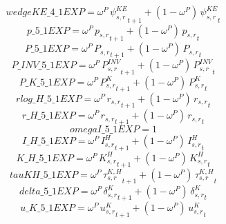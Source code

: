 \begin{dmath*}
wedgeKE\_4\_1EXP = {{\omega^{P}}}\, {{\psi^{KE}_{s,r}}}_{t+1}+\left(1-{{\omega^{P}}}\right)\, {{\psi^{KE}_{s,r}}}_{t}
\end{dmath*}
\begin{dmath*}
p\_5\_1EXP = {{\omega^{P}}}\, {{p_{s,r}}}_{t+1}+\left(1-{{\omega^{P}}}\right)\, {{p_{s,r}}}_{t}
\end{dmath*}
\begin{dmath*}
P\_5\_1EXP = {{\omega^{P}}}\, {{P_{s,r}}}_{t+1}+\left(1-{{\omega^{P}}}\right)\, {{P_{s,r}}}_{t}
\end{dmath*}
\begin{dmath*}
P\_INV\_5\_1EXP = {{\omega^{P}}}\, {{P^{INV}_{s,r}}}_{t+1}+\left(1-{{\omega^{P}}}\right)\, {{P^{INV}_{s,r}}}_{t}
\end{dmath*}
\begin{dmath*}
P\_K\_5\_1EXP = {{\omega^{P}}}\, {{P^K_{s,r}}}_{t+1}+\left(1-{{\omega^{P}}}\right)\, {{P^K_{s,r}}}_{t}
\end{dmath*}
\begin{dmath*}
rlog\_H\_5\_1EXP = {{\omega^{P}}}\, {{r_{s,r}}}_{t+1}+\left(1-{{\omega^{P}}}\right)\, {{r_{s,r}}}_{t}
\end{dmath*}
\begin{dmath*}
r\_H\_5\_1EXP = {{\omega^{P}}}\, {{r_{s,r}}}_{t+1}+\left(1-{{\omega^{P}}}\right)\, {{r_{s,r}}}_{t}
\end{dmath*}
\begin{dmath*}
omegaI\_5\_1EXP = 1
\end{dmath*}
\begin{dmath*}
I\_H\_5\_1EXP = {{\omega^{P}}}\, {{I^H_{s,r}}}_{t+1}+\left(1-{{\omega^{P}}}\right)\, {{I^H_{s,r}}}_{t}
\end{dmath*}
\begin{dmath*}
K\_H\_5\_1EXP = {{\omega^{P}}}\, {{K^H_{s,r}}}_{t+1}+\left(1-{{\omega^{P}}}\right)\, {{K^H_{s,r}}}_{t}
\end{dmath*}
\begin{dmath*}
tauKH\_5\_1EXP = {{\omega^{P}}}\, {{\tau^{K,H}_{s,r}}}_{t+1}+\left(1-{{\omega^{P}}}\right)\, {{\tau^{K,H}_{s,r}}}_{t}
\end{dmath*}
\begin{dmath*}
delta\_5\_1EXP = {{\omega^{P}}}\, {{\delta^{K}_{s,r}}}_{t+1}+\left(1-{{\omega^{P}}}\right)\, {{\delta^{K}_{s,r}}}_{t}
\end{dmath*}
\begin{dmath*}
u\_K\_5\_1EXP = {{\omega^{P}}}\, {{u^K_{s,r}}}_{t+1}+\left(1-{{\omega^{P}}}\right)\, {{u^K_{s,r}}}_{t}
\end{dmath*}
